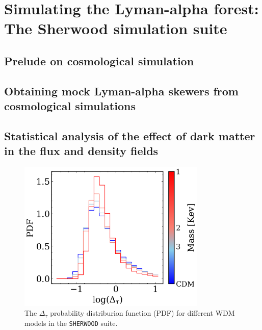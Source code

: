 \chapter{Simulating the Lyman-alpha forest: The Sherwood simulation suite} \label{chap:sherwood}

\section{Prelude on cosmological simulation}

\section{Obtaining mock Lyman-alpha skewers from cosmological simulations}

\section{Statistical analysis of the effect of dark matter in the flux and density fields}


\begin{figure}
        \centering
            \includegraphics[width=0.8\textwidth]{img/ML/pdf_density_sherwood.png}
            \caption{The $\Delta_\tau$ probability distriburion function (PDF) for different WDM models in the \texttt{SHERWOOD} suite.}
            \label{fig: exact density PDF}
\end{figure}
    
